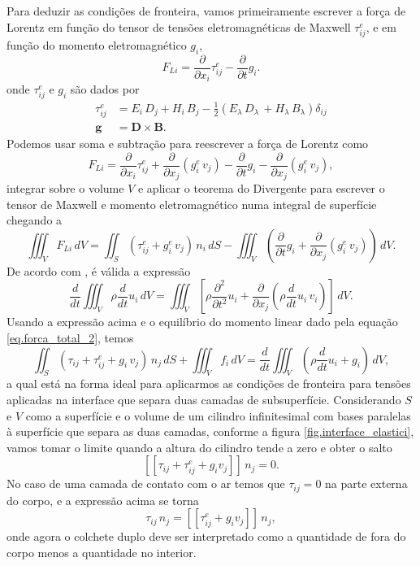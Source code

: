 Para deduzir as condi\c{c}\~oes de fronteira, vamos primeiramente escrever a for\c{c}a de Lorentz em fun\c{c}\~ao do tensor de tens\~oes eletromagn\'eticas de Maxwell $\tau_{ij}^e$, e em fun\c{c}\~ao do momento eletromagn\'etico $g_i$,
\begin{equation}
F_{Li}=\frac{\partial}{\partial x_i}\tau_{ij}^e-\frac{\partial}{\partial t}g_i.
\end{equation}
onde $\tau_{ij}^e$ e $g_i$ s\~ao dados por
\begin{align*}
\tau_{ij}^e&=E_i\,D_j+H_i\,B_j-\frac{1}{2}(E_\lambda\,D_\lambda\,+H_\lambda\,B_\lambda)\delta_{ij}\\
\mathbf{g}&=\mathbf{D}\times\mathbf{B}.
\end{align*}
Podemos usar soma e subtra\c{c}\~ao para reescrever a for\c{c}a de Lorentz como
\begin{equation}
F_{Li}=\frac{\partial}{\partial x_i}\tau_{ij}^e+\frac{\partial}{\partial x_j}(g_i^e\,v_j)-\frac{\partial}{\partial t}g_i-\frac{\partial}{\partial x_j}(g_i^e\,v_j),
\end{equation}
integrar sobre o volume $V$ e aplicar o teorema do Divergente para escrever o tensor de Maxwell e momento eletromagn\'etico numa integral de superf\'icie chegando a 
\begin{equation}
\iiint_VF_{Li}\,dV=\iint_S(\tau_{ij}^e+g_i^e\,v_j)\,n_i\,dS-\iiint_V\left(\frac{\partial}{\partial t}g_i+\frac{\partial}{\partial x_j}(g_i^e\,v_j)\right)\,dV.
\end{equation}
De acordo com \cite{Eringen_1962}, \'e v\'alida a express\~ao
\begin{equation}
\frac{d}{dt}\iiint_V\rho\frac{d}{dt}u_i\,dV=\iiint_V\left[\rho\frac{\partial^2}{\partial t^2}u_i+\frac{\partial}{\partial x_j}\left(\rho\frac{d}{dt}u_i\,v_i\right)\right]\,dV.
\end{equation}
Usando a express\~ao acima e o equil\'ibrio do momento linear dado pela equa\c{c}\~ao \ref{eq.forca_total_2}, temos
\begin{equation}
\iint_S\left(\tau_{ij}+\tau_{ij}^e+g_i\,v_j\right)\,n_j\,dS+\iiint_Vf_i\,dV=\frac{d}{dt}\iiint_V\left(\rho\frac{d}{dt}u_i+g_i\right)\,dV,
\end{equation}
a qual est\'a na forma ideal para aplicarmos as condi\c{c}\~oes de fronteira para tens\~oes aplicadas na interface que separa duas camadas de subsuperf\'icie. Considerando $S$ e $V$ como a superf\'icie e o volume de um cilindro infinitesimal  com bases paralelas \`a superf\'icie que separa as duas camadas, conforme a figura \ref{fig.interface_elastici}, vamos tomar o limite quando a altura do cilindro tende a zero e obter o salto
\begin{equation}
\left[\left[\tau_{ij}+\tau^e_{ij}+g_iv_j\right]\right]\,n_j=0.
\end{equation}
No caso de uma camada de contato com o ar temos que $\tau_{ij}=0$ na parte externa do corpo, e a express\~ao acima se torna 
\begin{equation}
\tau_{ij}\,n_j=\left[\left[\tau^e_{ij}+g_iv_j\right]\right]\,n_j,
\end{equation} 
onde agora o colchete duplo deve ser interpretado como a quantidade de fora do corpo menos a quantidade no interior.

